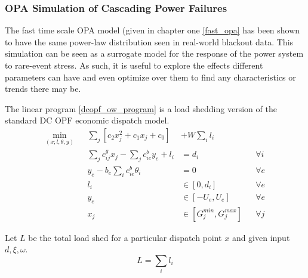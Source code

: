 \subsubsection{OPA Simulation of Cascading Power Failures}
The fast time scale OPA model (given in chapter one \ref{fast_opa} has been shown to have the same power-law distribution seen in real-world blackout data.  This simulation can be seen as a surrogate model for the response of the power system to rare-event stress.  As such, it is useful to explore the effects different parameters can have and even optimize over them to find any characteristics or trends there may be.

The linear program \ref{dcopf_ow_program} is a load shedding version of the standard DC OPF economic dispatch model.  
\begin{subequations}
\label{dcopf_ow_program}
\begin{alignat}{3}
\min_{\left(x;l,\theta,y\right)} && \displaystyle\sum_j \left[  c_2 x_j^2  + c_1 x_j + c_0 \right] &+ W \sum_i l_i &  \label{jcc_obj}\\
                        && \textstyle \sum_j c^g_{ij} x_j - \sum_j c^b_{ie} y_e   +l_i       &=d_i       && \forall i \label{opf_cons}\\ 
                 && y_e - b_e \textstyle \sum_i c^b_{ie} \theta_i          &=0         && \forall e \label{opf_kcl}\\
                 && l_i &\in \left[ 0, d_i \right] && \forall e \label{opf_loadshed}\\
                 && y_e &\in \left[ -U_e, U_e \right] && \forall e \label{opf_limit}\\
                 && x_j &\in \left[ G^{min}_j, G^{max}_j \right] && \forall j  \label{opf_gen}  
\end{alignat}
\end{subequations}


Let $L$ be the total load shed for a particular dispatch point $x$ and given input $d,\xi,\omega$.
\begin{equation}
L = \sum_i l_i
\end{equation}

